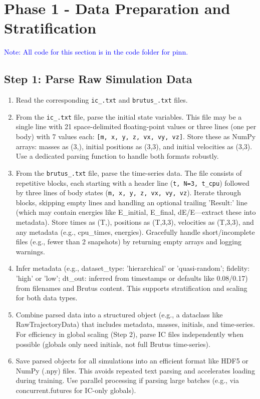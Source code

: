 \section{Phase 1 - Data Preparation and Stratification}

\textcolor{blue}{Note: All code for this section is in the code folder for pinn.}

\subsection{Step 1: Parse Raw Simulation Data}

\begin{enumerate}
    \item Read the corresponding \texttt{ic\_.txt} and \texttt{brutus\_.txt} files.
    
    \item From the \texttt{ic\_.txt} file, parse the initial state variables. This file may be a single line with 21 space-delimited 
    floating-point values or three lines (one per body) with 7 values each: \texttt{[m, x, y, z, vx, vy, vz]}. Store these as NumPy arrays: 
    masses as (3,), initial positions as (3,3), and initial velocities as (3,3). Use a dedicated parsing function to handle both formats robustly.
    
    
    \item From the \texttt{brutus\_.txt} file, parse the time-series data. The file consists of repetitive blocks, each starting with a header line 
    (\texttt{t, N=3, t\_cpu}) followed by three lines of body states (\texttt{m, x, y, z, vx, vy, vz}). 
    Iterate through blocks, skipping empty lines and handling an optional trailing 'Result:' line 
    (which may contain energies like E\_initial, E\_final, dE/E—extract these into metadata). Store times as (T,), positions as (T,3,3), 
    velocities as (T,3,3), and any metadata (e.g., cpu\_times, energies). 
    Gracefully handle short/incomplete files (e.g., fewer than 2 snapshots) by returning empty arrays and logging warnings.


    \item Infer metadata (e.g., dataset\_type: 'hierarchical' or 'quasi-random'; fidelity: 'high' or 'low'; dt\_out: inferred from timestamps or 
    defaults like 0.08/0.17) from filenames and Brutus content. This supports stratification and scaling for both data types.


    \item Combine parsed data into a structured object (e.g., a dataclass like RawTrajectoryData) that includes metadata, masses, 
    initials, and time-series. For efficiency in global scaling (Step 2), parse IC files independently when possible (globals only need initials, 
    not full Brutus time-series).



    \item Save parsed objects for all simulations into an efficient format like HDF5 or NumPy (.npy) files. 
    This avoids repeated text parsing and accelerates loading during training. Use parallel processing if parsing large batches 
    (e.g., via concurrent.futures for IC-only globals).
\end{enumerate}
    
